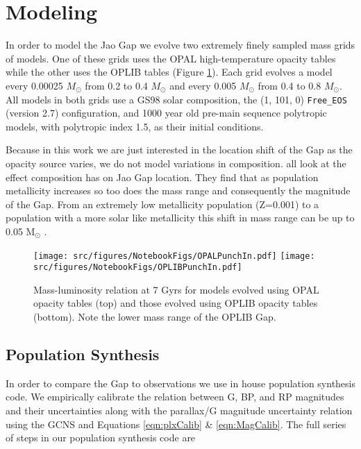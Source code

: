 \section{Modeling}\label{sec:modeling}
In order to model the Jao Gap we evolve two extremely finely sampled mass grids
of models. One of these grids uses the OPAL high-temperature opacity tables
while the other uses the OPLIB tables (Figure \ref{fig:PunchIn}). Each grid
evolves a model every 0.00025 $M_{\odot}$ from 0.2 to 0.4 $M_{\odot}$ and every
0.005 $M_{\odot}$ from 0.4 to 0.8 $M_{\odot}$. All models in both grids use a
GS98 solar composition, the (1, 101, 0) \texttt{Free\_EOS} (version
{\color{red}2.7}) configuration, and 1000 year old pre-main sequence polytropic
models, with polytropic index 1.5, as their initial conditions.

Because in this work we are just interested in the location shift of the Gap as
the opacity source varies, we do not model variations in composition.
\citet{Mansfield2021,Jao2020,Feiden2021} all look at the effect composition has
on Jao Gap location. They find that as population metallicity increases so too
does the mass range and consequently the magnitude of the Gap. From an extremely
low metallicity population (Z=0.001) to a population with a more solar like
metallicity this shift in mass range can be up to 0.05 M$_{\odot}$
\citep{Mansfield2021}.

\begin{figure}
	\centering
	\texttt{[image: src/figures/NotebookFigs/OPALPunchIn.pdf]}
	\texttt{[image: src/figures/NotebookFigs/OPLIBPunchIn.pdf]}
	\caption{Mass-luminosity relation at 7 Gyrs for models evolved using OPAL opacity
	tables (top) and those evolved using OPLIB opacity tables (bottom). Note
	the lower mass range of the OPLIB Gap.}
	\label{fig:PunchIn}
		
\end{figure}

\subsection{Population Synthesis}
In order to compare the Gap to observations we use in house population
synthesis code. We empirically calibrate the relation between G, BP, and RP
magnitudes and their uncertainties along with the parallax/G magnitude
uncertainty relation using the GCNS and Equations \ref{eqn:plxCalib} \&
\ref{eqn:MagCalib}. The full series of steps in our population synthesis code
are

